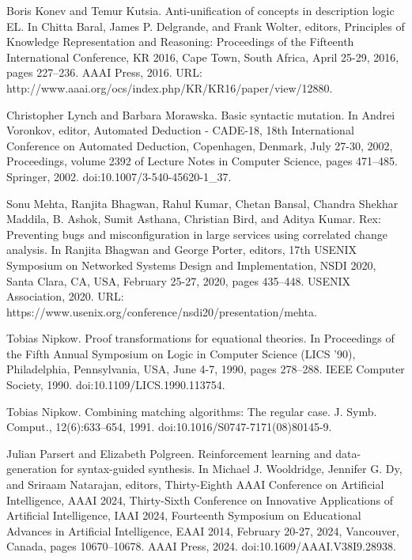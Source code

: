 \par\noindent  [31]  Boris Konev and Temur Kutsia.  Anti-unification of concepts in description logic EL.  In Chitta Baral, James P. Delgrande, and Frank Wolter, editors, Principles of Knowledge Representation and Reasoning: Proceedings of the Fifteenth International Conference, KR 2016, Cape Town, South Africa, April 25-29, 2016, pages 227–236. AAAI Press, 2016.  URL: http://www.aaai.org/ocs/index.php/KR/KR16/paper/view/12880.  
 
\par\noindent  [32]  Christopher Lynch and Barbara Morawska.  Basic syntactic mutation.  In Andrei Voronkov, editor, Automated Deduction - CADE-18, 18th International Conference on Automated Deduction, Copenhagen, Denmark, July 27-30, 2002, Proceedings, volume 2392 of Lecture Notes in Computer Science, pages 471–485. Springer, 2002.  doi:10.1007/3-540-45620-1\_37.  
 
\par\noindent  [33]  Sonu Mehta, Ranjita Bhagwan, Rahul Kumar, Chetan Bansal, Chandra Shekhar Maddila, B. Ashok, Sumit Asthana, Christian Bird, and Aditya Kumar.  Rex: Preventing bugs and misconfiguration in large services using correlated change analysis.  In Ranjita Bhagwan and George Porter, editors, 17th USENIX Symposium on Networked Systems Design and Implementation, NSDI 2020, Santa Clara, CA, USA, February 25-27, 2020, pages 435–448. USENIX Association, 2020.  URL: https://www.usenix.org/conference/nsdi20/presentation/mehta.  
 
\par\noindent  [34]  Tobias Nipkow.  Proof transformations for equational theories.  In Proceedings of the Fifth Annual Symposium on Logic in Computer Science (LICS ’90), Philadelphia, Pennsylvania, USA, June 4-7, 1990, pages 278–288. IEEE Computer Society, 1990.  doi:10.1109/LICS.1990.113754.  
 
\par\noindent  [35]  Tobias Nipkow.  Combining matching algorithms: The regular case.  J. Symb. Comput., 12(6):633–654, 1991.  doi:10.1016/S0747-7171(08)80145-9.  
 
\par\noindent  [36]  Julian Parsert and Elizabeth Polgreen.  Reinforcement learning and data-generation for syntax-guided synthesis.  In Michael J. Wooldridge, Jennifer G. Dy, and Sriraam Natarajan, editors, Thirty-Eighth AAAI Conference on Artificial Intelligence, AAAI 2024, Thirty-Sixth Conference on Innovative Applications of Artificial Intelligence, IAAI 2024, Fourteenth Symposium on Educational Advances in Artificial Intelligence, EAAI 2014, February 20-27, 2024, Vancouver, Canada, pages 10670–10678. AAAI Press, 2024.  doi:10.1609/AAAI.V38I9.28938.  
 
